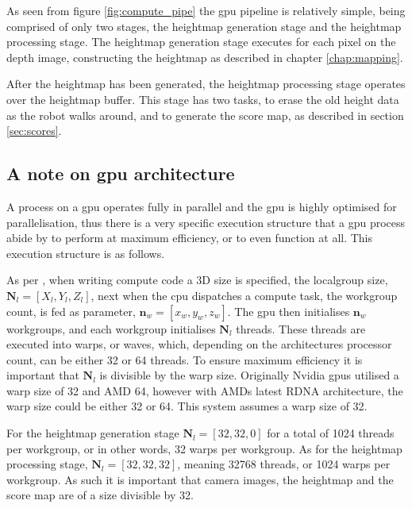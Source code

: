         \noindent
        As seen from figure \ref{fig:compute_pipe} the \ac{gpu} pipeline is relatively simple, being comprised of only two stages, the heightmap generation
        stage and the heightmap processing stage. The heightmap generation stage executes for each pixel on the depth image, constructing the heightmap as 
        described in chapter \ref{chap:mapping}.
        
        After the heightmap has been generated, the heightmap processing stage operates over the heightmap buffer. This stage has two tasks, to erase the
        old height data as the robot walks around, and to generate the score map, as described in section \ref{sec:scores}.
        
        \newpage
        \subsection{A note on \ac{gpu} architecture}
            A process on a \ac{gpu} operates fully in parallel and the \ac{gpu} is highly optimised for parallelisation, thus there is a very specific
            execution structure that a \ac{gpu} process abide by to perform at maximum efficiency, or to even function at all. This execution structure is
            as follows.
            
            As per \cite{nvidia_doc}, when writing compute code a 3D size is specified, the localgroup size, \(\bm{N}_{l} = [X_l,Y_{l},Z_{l}]\), next when the \ac{cpu} dispatches
            a compute task, the workgroup count, is fed as parameter, \(\bm{n}_{w} = [x_{w},y_{w},z_{w}]\). The \ac{gpu} then initialises
            \(\bm{n}_w\) workgroups, and each workgroup initialises \(\bm{N}_l\) threads. These threads are executed into warps, or waves, which, depending on the architectures processor count,
            can be either 32 or 64 threads. To ensure maximum efficiency it is important that \(\bm{N}_l\) is divisible by the warp size.
            Originally Nvidia \ac{gpu}s utilised a warp size of 32 and AMD 64, however with AMDs latest RDNA architecture, the warp size could be either 32 or 64.
            This system assumes a warp size of 32.
            
            For the heightmap generation stage \(\bm{N}_{l} = [32,32,0]\) for a total of 1024 threads per workgroup, or in other words, 32 warps per workgroup.
            As for the heightmap processing stage, \(\bm{N}_{l} = [32,32,32]\), meaning 32768 threads, or 1024 warps per workgroup.
            As such it is important that camera images, the heightmap and the score map are of a size divisible by 32.
        

